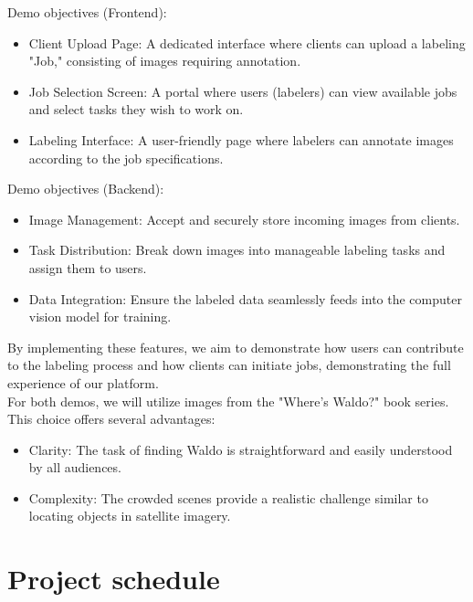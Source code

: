 \documentclass{article}
\begin{document}
Demo objectives (Frontend):

\begin{itemize}
    \item Client Upload Page: A dedicated interface where clients can upload a labeling "Job," consisting of images requiring annotation.
    \item Job Selection Screen: A portal where users (labelers) can view available jobs and select tasks they wish to work on.
    \item Labeling Interface: A user-friendly page where labelers can annotate images according to the job specifications.
\end{itemize}

Demo objectives (Backend):

\begin{itemize}
    \item Image Management: Accept and securely store incoming images from clients.
    \item Task Distribution: Break down images into manageable labeling tasks and assign them to users.
    \item Data Integration: Ensure the labeled data seamlessly feeds into the computer vision model for training.
\end{itemize}

By implementing these features, we aim to demonstrate how users can contribute to the labeling process and how clients can initiate jobs, demonstrating the full experience of our platform.\\

For both demos, we will utilize images from the "Where's Waldo?" book series. This choice offers several advantages:

\begin{itemize}
    \item Clarity: The task of finding Waldo is straightforward and easily understood by all audiences.
    \item Complexity: The crowded scenes provide a realistic challenge similar to locating objects in satellite imagery.
\end{itemize}

\section{Project schedule}
\end{document}
